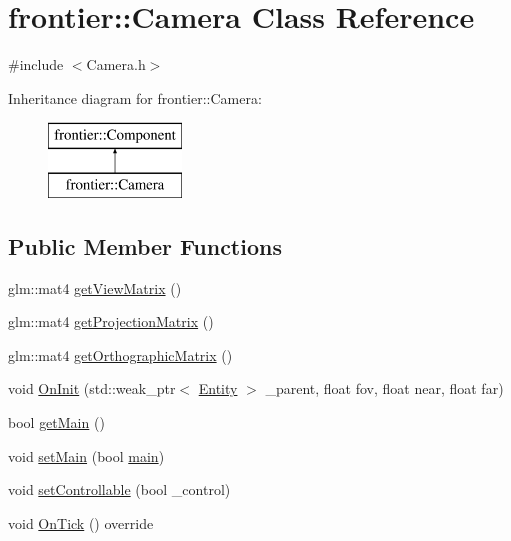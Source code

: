 \hypertarget{classfrontier_1_1_camera}{}\section{frontier\+:\+:Camera Class Reference}
\label{classfrontier_1_1_camera}


{\ttfamily \#include $<$Camera.\+h$>$}

Inheritance diagram for frontier\+:\+:Camera\+:\begin{figure}[H]
\begin{center}
\leavevmode
\includegraphics[height=2.000000cm]{classfrontier_1_1_camera}
\end{center}
\end{figure}
\subsection*{Public Member Functions}
\begin{DoxyCompactItemize}
\item 
glm\+::mat4 \hyperlink{classfrontier_1_1_camera_a90858bfacddb80bedb062889b15d2d47}{get\+View\+Matrix} ()
\item 
glm\+::mat4 \hyperlink{classfrontier_1_1_camera_ae3e5871e68bcb0d5577cc09b2273c641}{get\+Projection\+Matrix} ()
\item 
glm\+::mat4 \hyperlink{classfrontier_1_1_camera_a7c5d631b29e93e4e8772577dd3e62378}{get\+Orthographic\+Matrix} ()
\item 
void \hyperlink{classfrontier_1_1_camera_a7bec1b9133e266bf50396883cb3e2b83}{On\+Init} (std\+::weak\+\_\+ptr$<$ \hyperlink{classfrontier_1_1_entity}{Entity} $>$ \+\_\+parent, float fov, float near, float far)
\item 
bool \hyperlink{classfrontier_1_1_camera_a8e6077e5c7dd76f58e055a13e18ab8c6}{get\+Main} ()
\item 
void \hyperlink{classfrontier_1_1_camera_ae8a9b95bf6e4eacdae709d188725e72a}{set\+Main} (bool \hyperlink{main_8cpp_ae66f6b31b5ad750f1fe042a706a4e3d4}{main})
\item 
void \hyperlink{classfrontier_1_1_camera_ab1872f3ceccbb6dcfa4fcf043f0eb5f8}{set\+Controllable} (bool \+\_\+control)
\item 
void \hyperlink{classfrontier_1_1_camera_a1f318703a68e4c070c85a1d9a27446d0}{On\+Tick} () override
\end{DoxyCompactItemize}
